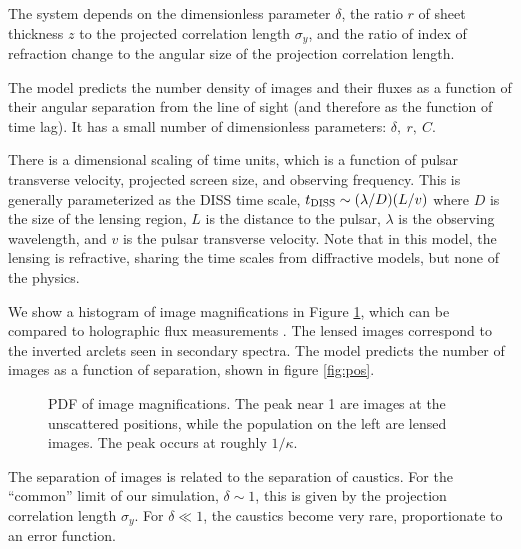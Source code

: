 \documentclass[useAMS,usenatbib]{mn2e}
\begin{document}
The system depends on the dimensionless parameter $\delta$, the ratio $r$
of sheet thickness $z$ to the projected correlation length $\sigma_y$,
and the ratio of index of refraction change to the angular size of the
projection correlation length.

The model predicts the number density of images and their fluxes as a
function of their angular separation from the line of sight (and
therefore as the function of time lag).  It has a small number of
dimensionless parameters: $\delta,\ r,\ C$.



There is a
dimensional scaling of time units, which is a function of pulsar
transverse velocity, projected screen size, and observing frequency.
This is generally parameterized as the DISS time scale, $t_{\rm DISS}
\sim (\lambda/D) (L/v)$ where $D$ is the size of the lensing region,
$L$ is the distance to the pulsar, $\lambda$ is the observing
wavelength, and $v$ is the pulsar transverse velocity.  Note that in
this model, the lensing is refractive, sharing the time scales from
diffractive models, but none of the physics.



We show a histogram of image magnifications in Figure \ref{fig:mhist},
which can be compared to holographic flux measurements
\citep{2008MNRAS.388.1214W}. The lensed images correspond to the
inverted arclets seen in secondary spectra.  The model predicts the
number of images as a function of separation, shown in figure
\ref{fig:pos}.





\begin{figure}
\centerline{}
\caption{PDF of image magnifications.  The peak near 1 are images at
  the unscattered positions, while the population on the left are
  lensed images.  The peak occurs at roughly $1/\kappa$.
}
\label{fig:mhist}
\end{figure}


The separation of images is related to the separation of caustics.
For the ``common'' limit of our simulation, $\delta \sim 1$, this is
given by the projection correlation length $\sigma_y$.  For $\delta \ll
1$, the caustics become very rare, proportionate to an error
function.   
\end{document}
